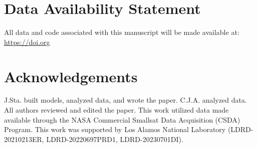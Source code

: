 \documentclass{article}
\begin{document}
\section{Data Availability Statement}

All data and code associated with this manuscript will be made available at: \href{https://doi.org}{https://doi.org}

\section{Acknowledgements}

J.Sta. built models, analyzed data, and wrote the paper. C.J.A. analyzed data. All authors reviewed and edited the paper. This work utilized data made available through the NASA Commercial Smallsat Data Acquisition (CSDA) Program. This work was supported by Los Alamos National Laboratory (LDRD-20210213ER, LDRD-20220697PRD1, LDRD-20230701DI).



\end{document}
